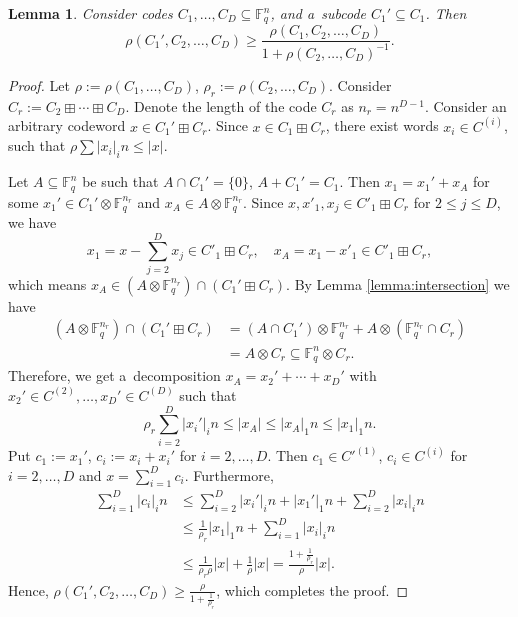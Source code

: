 \documentclass[conference]{IEEEtran}
\let\le\leqslant
\let\ge\geqslant
\theoremstyle{plain}
\newtheorem{lemma}[theorem]{Lemma}
\theoremstyle{definition}
\theoremstyle{remark}
\newcommand{\F}{\mathbb{F}}
\begin{document}
\begin{lemma}\label{lemma:subcode-exp}
Consider codes $C_1,\dots,C_D\subseteq\F_q^n$, and a~subcode $C_1' \subseteq C_1$. Then 
\[\rho(C_1',C_2,\dots,C_D) \ge \frac{\rho(C_1,C_2,\dots,C_D)}{1+\rho(C_2,\dots,C_D)^{-1}}
.\]
\end{lemma}
\begin{proof}
    Let $\rho:=\rho(C_1,\dots,C_D)$, $\rho_r:=\rho(C_2,\dots,C_D)$.  Consider $C_r := C_2\boxplus\cdots\boxplus C_D$. Denote the length of the code $C_r$ as $n_r=n^{D-1}$. Consider an arbitrary codeword $x \in C_1' \boxplus C_r$. Since $x \in C_1 \boxplus C_r$, there exist words $x_i \in C^{(i)}$, such that $\rho\sum |x_i|_i n \le |x|$. 

    Let $A \subseteq \F_q^{n}$ be such that $A \cap C_1' = \{0\}$, $A + C_1' = C_1$. Then $x_1 = x_1' + x_A$ for some $x_1' \in C_1' \otimes \F_q^{n_r}$ and $x_A \in A \otimes \F_q^{n_r}$. Since $x, x'_1, x_j\in C'_1\boxplus C_r$ for $2\le j\le D$, we have \[
        x_1=x-\sum_{j=2}^Dx_j\in C'_1\boxplus C_r,\quad x_A=x_1-x'_1\in C'_1\boxplus C_r,
    \]
    which means $x_A \in (A \otimes \F_q^{n_r}) \cap (C_1' \boxplus C_r)$. By Lemma \ref{lemma:intersection} we have
    \begin{align*}
    (A \otimes \F_q^{n_r}) \cap (C_1' \boxplus C_r) 
    &= (A \cap C_1') \otimes \F_q^{n_r}\! +\! A \otimes (\F_q^{n_r} \cap C_r) \\
    &= A \otimes C_r \subseteq \F_q^{n} \otimes C_r.
    \end{align*}
    Therefore, we get a~decomposition $x_A = x_2' + \cdots + x_D'$ with $x_2' \in C^{(2)}, \dots, x_D' \in C^{(D)}$ such that \[
        \rho_r \sum_{i=2}^D |x_i'|_i n \le |x_A| \le |x_A|_1 n \le |x_1|_1 n.
    \] 
    Put $c_1 := x_1'$, $c_i := x_i + x_i'$ for $i=2,\dots,D$. Then $c_1 \in C'^{(1)}$, $c_i \in C^{(i)}$ for $i=2,\dots,D$ and
    \(x = \sum_{i=1}^D c_i\). Furthermore, 
    \begin{align*}
    \sum_{i=1}^D |c_i|_i n &\le \sum_{i=2}^D |x_i'|_i n + |x_1'|_1 n + \sum_{i=2}^D |x_i|_i n\\
    &\le \frac{1}{\rho_r}|x_1|_1n + \sum_{i=1}^D |x_i|_i n\\
    &\le \frac{1}{\rho_r \rho}|x| + \frac{1}{\rho}|x| = \frac{1 + \frac{1}{\rho_r}}{\rho}|x|.
    \end{align*}
    Hence, $\rho(C_1',C_2,\dots,C_D) \ge \frac{\rho}{1+\frac{1}{\rho_r}}$, which completes the proof. 
\end{proof}
\end{document}
